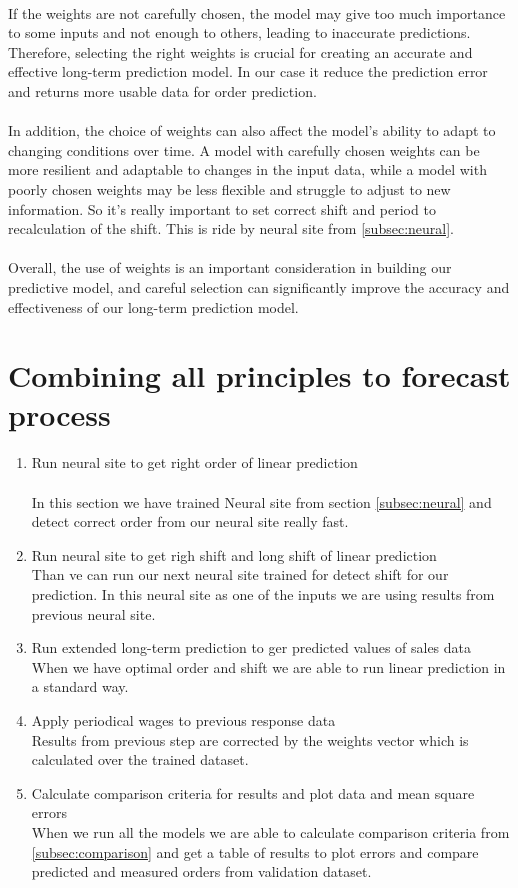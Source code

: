     \\
    If the weights are not carefully chosen, the model may give too much importance to some inputs and not enough to others,
    leading to inaccurate predictions. Therefore, selecting the right weights is crucial for creating an accurate and
    effective long-term prediction model. In our case it reduce the prediction error and returns more usable
    data for order prediction.\\
    \\
    In addition, the choice of weights can also affect the model's ability to adapt to changing conditions over time.
    A model with carefully chosen weights can be more resilient and adaptable to changes in the input data,
    while a model with poorly chosen weights may be less flexible and struggle to adjust to new information.
    So it's really important to set correct shift and period to recalculation of the shift.
    This is ride by neural site from \ref{subsec:neural}.\\
    \\
    Overall, the use of weights is an important consideration in building our predictive model, and careful selection
    can significantly improve the accuracy and effectiveness of our long-term prediction model.

    \section{Combining all principles to forecast process} \label{subsec:combining_models}
    \begin{enumerate}
        \item Run neural site to get right order of linear prediction \\
        \\
        In this section we have trained Neural site from section \ref{subsec:neural} and detect correct order from
        our neural site really fast.
        \item Run neural site to get righ shift and long shift of linear prediction\\
        Than ve can run our next neural site trained for detect shift for our prediction. In this neural site as
        one of the inputs we are using results from previous neural site.
        \item Run extended long-term prediction to ger predicted values of sales data\\
        When we have optimal order and shift we are able to run linear prediction in a standard way.
        \item Apply periodical wages to previous response data\\
        Results from previous step are corrected by the weights vector which is calculated over the trained dataset.
        \item Calculate comparison criteria for results and plot data and mean square errors\\
        When we run all the models we are able to calculate comparison criteria from \ref{subsec:comparison} and
        get a table of results to plot errors and compare predicted and measured orders from validation dataset.
    \end{enumerate}
